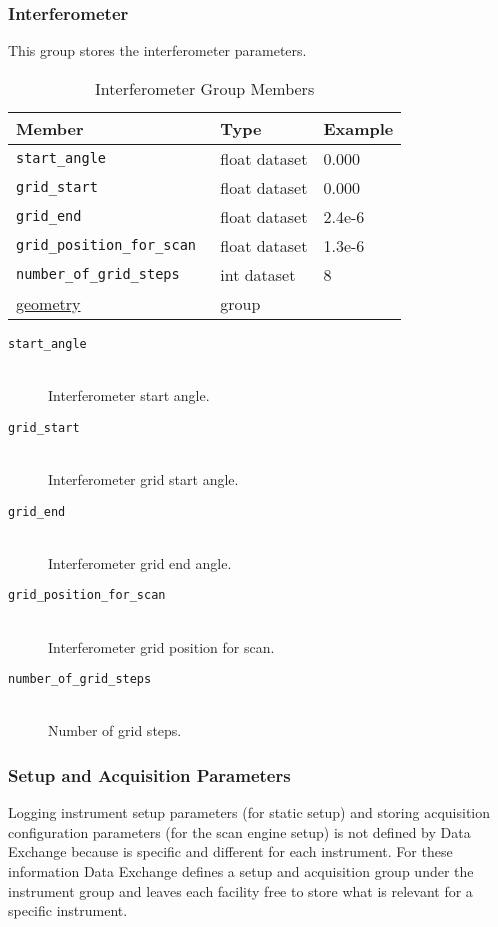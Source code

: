 \subsubsection{Interferometer}
\label{table:tomo:interferometer}

This group stores the interferometer parameters.

\begin{table}[h!]\sffamily \footnotesize
\caption{Interferometer Group Members}
\centering
{}
\begin{tabular}{l l l}

\toprule
\bfseries Member     & \bfseries Type & \bfseries Example \\
\midrule
\tt{start\_angle} & float dataset & 0.000 \\  
\tt{grid\_start} & float dataset & 0.000 \\
\tt{grid\_end} & float dataset & 2.4e-6 \\ 
\tt{grid\_position\_for\_scan} & float dataset & 1.3e-6 \\    
\tt{number\_of\_grid\_steps} & int dataset & 8    \\
\hyperref[tomo:geometry]{geometry} &  group & \\
\bottomrule
\end{tabular}
\end{table}

\begin{description}
\item[\tt{start\_angle}] \hfill \\
{Interferometer start angle.}

\item[\tt{grid\_start}] \hfill \\
{Interferometer grid start angle.}

\item[\tt{grid\_end}] \hfill \\
{Interferometer grid end angle.}

\item[\tt{grid\_position\_for\_scan}] \hfill \\
{Interferometer grid position for scan.}   

\item[\tt{number\_of\_grid\_steps}] \hfill \\
{Number of grid steps.}
\end{description}

\subsubsection{Setup and Acquisition Parameters}
\label{table:tomo:setup}
\label{table:tomo:acquisition}
Logging instrument setup parameters (for static setup) and storing acquisition configuration parameters (for the scan engine setup) is not defined by Data Exchange because is specific and different for each instrument. For these information Data Exchange defines a setup and acquisition group under the instrument group and leaves each facility free to store what is relevant for a specific instrument.

